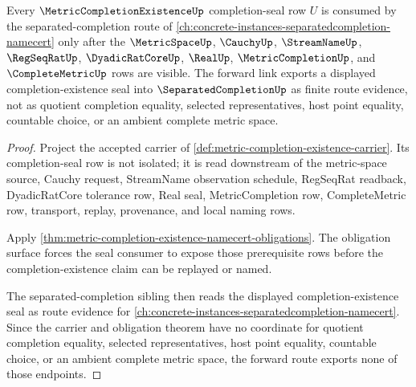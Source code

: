 \begin{theorem}
\label{thm:metric-completion-existence-separated-forward-route}
Every $\MetricCompletionExistenceUp$ completion-seal row $U$ is consumed by the separated-completion route of \autoref{ch:concrete-instances-separatedcompletion-namecert} only after the $\MetricSpaceUp$, $\CauchyUp$, $\StreamNameUp$, $\RegSeqRatUp$, $\DyadicRatCoreUp$, $\RealUp$, $\MetricCompletionUp$, and $\CompleteMetricUp$ rows are visible. The forward link exports a displayed completion-existence seal into $\SeparatedCompletionUp$ as finite route evidence, not as quotient completion equality, selected representatives, host point equality, countable choice, or an ambient complete metric space.
\end{theorem}
\begin{proof}
Project the accepted carrier of \autoref{def:metric-completion-existence-carrier}. Its completion-seal row is not isolated; it is read downstream of the metric-space source, Cauchy request, StreamName observation schedule, RegSeqRat readback, DyadicRatCore tolerance row, Real seal, MetricCompletion row, CompleteMetric row, transport, replay, provenance, and local naming rows.

Apply \autoref{thm:metric-completion-existence-namecert-obligations}. The obligation surface forces the seal consumer to expose those prerequisite rows before the completion-existence claim can be replayed or named.

The separated-completion sibling then reads the displayed completion-existence seal as route evidence for \autoref{ch:concrete-instances-separatedcompletion-namecert}. Since the carrier and obligation theorem have no coordinate for quotient completion equality, selected representatives, host point equality, countable choice, or an ambient complete metric space, the forward route exports none of those endpoints.
\end{proof}
